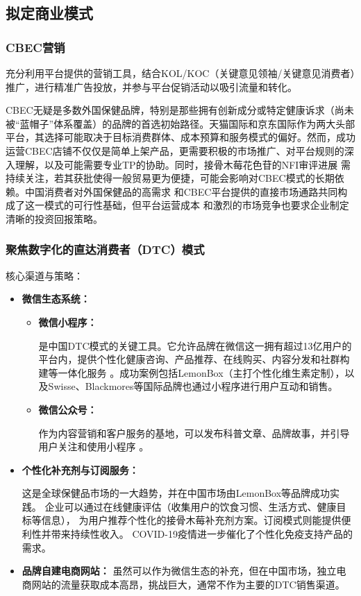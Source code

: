 \documentclass[12pt]{ctexart}
\begin{document}
\subsection{拟定商业模式}
\subsubsection{CBEC营销}
充分利用平台提供的营销工具，结合KOL/KOC（关键意见领袖/关键意见消费者）推广，进行精准广告投放，并参与平台促销活动以吸引流量和转化。

CBEC无疑是多数外国保健品牌，特别是那些拥有创新成分或特定健康诉求（尚未被“蓝帽子”体系覆盖）的品牌的首选初始路径。天猫国际和京东国际作为两大头部平台，其选择可能取决于目标消费群体、成本预算和服务模式的偏好。然而，成功运营CBEC店铺不仅仅是简单上架产品，更需要积极的市场推广、对平台规则的深入理解，以及可能需要专业TP的协助。同时，接骨木莓花色苷的NFI审评进展 需持续关注，若其获批使得一般贸易更为便捷，可能会影响对CBEC模式的长期依赖。中国消费者对外国保健品的高需求 和CBEC平台提供的直接市场通路共同构成了这一模式的可行性基础，但平台运营成本 和激烈的市场竞争也要求企业制定清晰的投资回报策略。

\subsubsection{聚焦数字化的直达消费者（DTC）模式}
核心渠道与策略：
\begin{itemize}
    \item \textbf{微信生态系统：}
        \begin{itemize}
            \item \textbf{微信小程序：}

            是中国DTC模式的关键工具。它允许品牌在微信这一拥有超过13亿用户的平台内，提供个性化健康咨询、产品推荐、在线购买、内容分发和社群构建等一体化服务 。成功案例包括LemonBox（主打个性化维生素定制），以及Swisse、Blackmores等国际品牌也通过小程序进行用户互动和销售。
            \item \textbf{微信公众号：}

            作为内容营销和客户服务的基地，可以发布科普文章、品牌故事，并引导用户关注和使用小程序 。
        \end{itemize}
    \item \textbf{个性化补充剂与订阅服务：}

    这是全球保健品市场的一大趋势，并在中国市场由LemonBox等品牌成功实践。
    企业可以通过在线健康评估（收集用户的饮食习惯、生活方式、健康目标等信息），
    为用户推荐个性化的接骨木莓补充剂方案。订阅模式则能提供便利性并带来持续性收入。
    COVID-19疫情进一步催化了个性化免疫支持产品的需求。
    \item \textbf{品牌自建电商网站：}
    虽然可以作为微信生态的补充，但在中国市场，独立电商网站的流量获取成本高昂，挑战巨大，通常不作为主要的DTC销售渠道。
\end{itemize}
\end{document}
